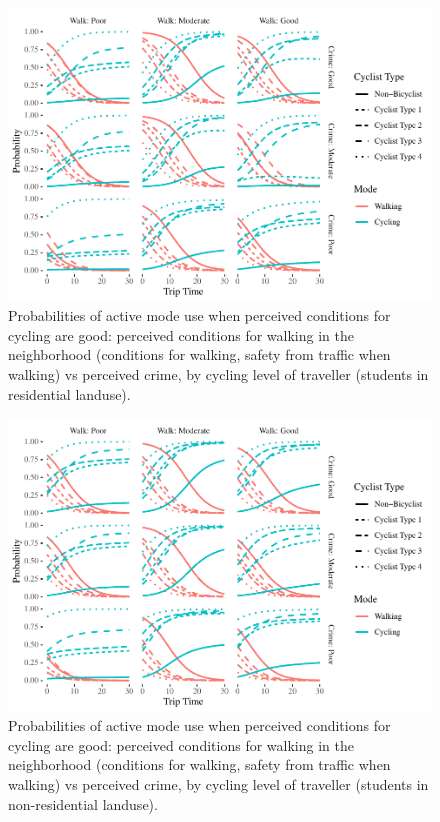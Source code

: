 \documentclass[]{elsarticle} %
\makeatletter
\def\maxwidth{\ifdim\Gin@nat@width>\linewidth\linewidth
\else\Gin@nat@width\fi}
\let\Oldincludegraphics\includegraphics
\renewcommand{\includegraphics}[1]{\Oldincludegraphics[width=\maxwidth]{#1}}
\makeatother
\begin{document}
\begin{figure}
\centering
\includegraphics{Active-Travel-in-Bangladesh_files/figure-latex/figure-probabilities-perceptions-walking-active-students-residential-1.pdf}
\caption{\label{fig:probabilities-perceptions-walking-active-modes-students-residential}Probabilities
of active mode use when perceived conditions for cycling are good:
perceived conditions for walking in the neighborhood (conditions for
walking, safety from traffic when walking) vs perceived crime, by
cycling level of traveller (students in residential landuse).}
\end{figure}

\begin{figure}
\centering
\includegraphics{Active-Travel-in-Bangladesh_files/figure-latex/figure-probabilities-perceptions-walking-active-students-non-residential-1.pdf}
\caption{\label{fig:probabilities-perceptions-walking-active-modes-students-non-residnetial}Probabilities
of active mode use when perceived conditions for cycling are good:
perceived conditions for walking in the neighborhood (conditions for
walking, safety from traffic when walking) vs perceived crime, by
cycling level of traveller (students in non-residential landuse).}
\end{figure}
\end{document}
